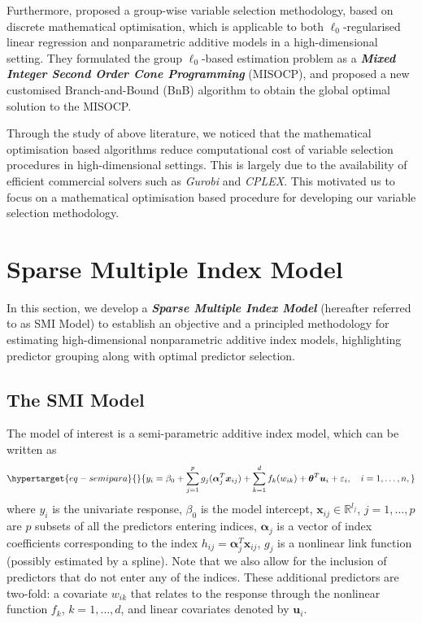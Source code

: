 \documentclass[11pt,a4paper,]{article}
\begin{document}
Furthermore, \textcite{Hazimeh2023} proposed a group-wise variable
selection methodology, based on discrete mathematical optimisation,
which is applicable to both \(\ell_{0}\)-regularised linear regression
and nonparametric additive models in a high-dimensional setting. They
formulated the group \(\ell_{0}\)-based estimation problem as a
\textbf{\emph{Mixed Integer Second Order Cone Programming}} (MISOCP),
and proposed a new customised Branch-and-Bound (BnB) algorithm
\autocite{Land1960,Little1963} to obtain the global optimal solution to
the MISOCP.

Through the study of above literature, we noticed that the mathematical
optimisation based algorithms reduce computational cost of variable
selection procedures in high-dimensional settings. This is largely due
to the availability of efficient commercial solvers such as
\emph{Gurobi} and \emph{CPLEX}. This motivated us to focus on a
mathematical optimisation based procedure for developing our variable
selection methodology.

\hypertarget{sec-SMI}{%
\section{Sparse Multiple Index Model}\label{sec-SMI}}

In this section, we develop a \textbf{\emph{Sparse Multiple Index
Model}} (hereafter referred to as SMI Model) to establish an objective
and a principled methodology for estimating high-dimensional
nonparametric additive index models, highlighting predictor grouping
along with optimal predictor selection.

\hypertarget{sec-model}{%
\subsection{The SMI Model}\label{sec-model}}

The model of interest is a semi-parametric additive index model, which
can be written as \begin{equation}\protect\hypertarget{eq-semipara}{}{
  y_{i} = \beta_{0} + \sum_{j = 1}^{p}g_{j}(\bm{\alpha}_{j}^{T}\bm{x}_{ij}) + \sum_{k = 1}^{d}f_{k}(w_{ik}) + \bm{\theta}^{T}\bm{u}_{i} + \varepsilon_{i}, \quad i = 1, \dots, n,
}\label{eq-semipara}\end{equation} where \(y_{i}\) is the univariate
response, \(\beta_{0}\) is the model intercept,
\(\bm{x}_{ij} \in \mathbb{R}^{l_{j}}\), \(j = 1, \dots, p\) are \(p\)
subsets of all the predictors entering indices, \(\bm{\alpha}_{j}\) is a
vector of index coefficients corresponding to the index
\(h_{ij} = \bm{\alpha}_{j}^{T}\bm{x}_{ij}\), \(g_{j}\) is a nonlinear
link function (possibly estimated by a spline). Note that we also allow
for the inclusion of predictors that do not enter any of the indices.
These additional predictors are two-fold: a covariate \(w_{ik}\) that
relates to the response through the nonlinear function \(f_{k}\),
\(k = 1, \dots, d\), and linear covariates denoted by \(\bm{u}_{i}\).
\end{document}
